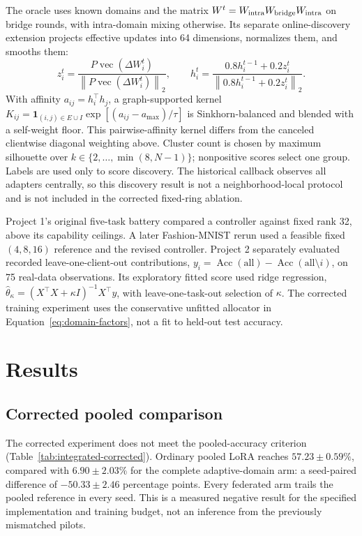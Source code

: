 \documentclass[11pt]{article}
\newcommand{\dW}{\Delta W}
\newcommand{\norm}[1]{\left\lVert#1\right\rVert}
\newcommand{\Acc}{\operatorname{Acc}}
\begin{document}
The oracle uses known domains and the matrix $W^t=W_{\rm intra}W_{\rm bridge}W_{\rm intra}$ on bridge rounds, with intra-domain mixing otherwise. Its separate online-discovery extension projects effective updates into 64 dimensions, normalizes them, and smooths them:
\begin{equation}
 z_i^t=\frac{P\operatorname{vec}(\dW_i^t)}{\norm{P\operatorname{vec}(\dW_i^t)}_2},\qquad
 h_i^t=\frac{0.8h_i^{t-1}+0.2z_i^t}{\norm{0.8h_i^{t-1}+0.2z_i^t}_2}.
\end{equation}
With affinity $a_{ij}=h_i^\top h_j$, a graph-supported kernel $K_{ij}=\mathbf1_{(i,j)\in E\cup I}\exp[(a_{ij}-a_{\max})/\tau]$ is Sinkhorn-balanced and blended with a self-weight floor. This pairwise-affinity kernel differs from the canceled clientwise diagonal weighting above. Cluster count is chosen by maximum silhouette over $k\in\{2,\ldots,\min(8,N-1)\}$; nonpositive scores select one group. Labels are used only to score discovery. The historical callback observes all adapters centrally, so this discovery result is not a neighborhood-local protocol and is not included in the corrected fixed-ring ablation.

Project 1's original five-task battery compared a controller against fixed rank 32, above its capability ceilings. A later Fashion-MNIST rerun used a feasible fixed $(4,8,16)$ reference and the revised controller. Project 2 separately evaluated recorded leave-one-client-out contributions, $y_i=\Acc(\mathrm{all})-\Acc(\mathrm{all}\setminus i)$, on 75 real-data observations. Its exploratory fitted score used ridge regression, $\widehat\theta_\kappa=(X^\top X+\kappa I)^{-1}X^\top y$, with leave-one-task-out selection of $\kappa$. The corrected training experiment uses the conservative unfitted allocator in Equation~\eqref{eq:domain-factors}, not a fit to held-out test accuracy.

\section{Results}
\subsection{Corrected pooled comparison}


The corrected experiment does not meet the pooled-accuracy criterion (Table~\ref{tab:integrated-corrected}). Ordinary pooled LoRA reaches $57.23\pm0.59\%$, compared with $6.90\pm2.03\%$ for the complete adaptive-domain arm: a seed-paired difference of $-50.33\pm2.46$ percentage points. Every federated arm trails the pooled reference in every seed. This is a measured negative result for the specified implementation and training budget, not an inference from the previously mismatched pilots.
\end{document}
